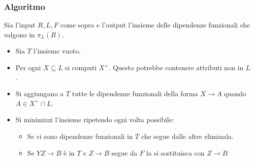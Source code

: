 \subsubsection{Algoritmo}
Sia l'input $R,L,F$ come sopra e l'output l'insieme delle dipendenze funzionali che valgono in $\pi_L(R)$.
\begin{itemize}
\item Sia $T$ l'insieme vuoto.
\item Per ogni $X\subseteq L$ si computi $X^+$. Questo potrebbe contenere attributi non in $L$. 
\item Si aggiungano a $T$ tutte le dipendenze funzionali della forma $X\rightarrow A$ quando $A\in X^+\cap L$.
\item Si minimizzi l'insieme ripetendo ogni volta possibile:
\begin{itemize}
\item Se ci sono dipendenze funzionali in $T$ che segue dalle altre eliminala.
\item Se $YZ\rightarrow B$ \`e in $T$ e $Z\rightarrow B$ segue da $F$ la si sostituisca con $Z\rightarrow B$
\end{itemize}
\end{itemize}